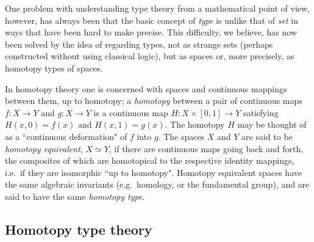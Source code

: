 {One problem with understanding type theory from a mathematical point of view, however, has always been that the basic concept of \emph{type} is unlike that of \emph{set} in ways that have been hard to make precise. This difficulty, we believe, has now been solved by the idea of regarding types, not as strange sets (perhaps constructed without using classical logic), but as spaces or, more precisely, as homotopy types of spaces.

In homotopy theory one is concerned with spaces and continuous mappings between them, 
up to homotopy; a \emph{homotopy} between a pair of continuous maps $f \colon X	\to Y$
and  $g \colon X	\to Y$ is 
a continuous map $H \colon X \times [0, 1]	\to Y$ satisfying
$H(x, 0) = f (x)$  and $H(x, 1) = g(x)$. The homotopy $H$ may be thought of as a ``continuous deformation" of $f$ into $g$. The spaces $X$ and $Y$ are said to be \emph{homotopy equivalent}, $X\simeq Y$, if there are continuous maps going back and forth, the composites of which are homotopical to the respective identity mappings, i.e.\ if they are isomorphic ``up to homotopy".  Homotopy equivalent spaces have the same algebraic invariants (e.g.\ homology, or the fundamental group), and are said to have the same \emph{homotopy type}.

\subsection*{Homotopy type theory}

}
